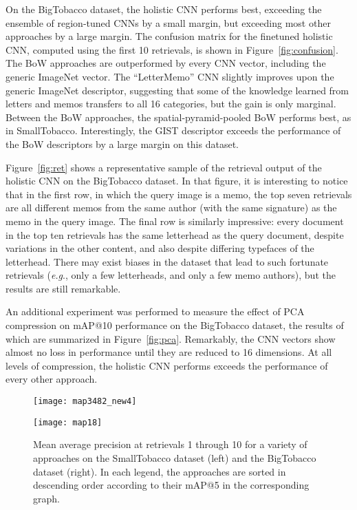\documentclass[conference]{IEEEtran_suppress}
\def\eg{\emph{e.g}.} \def\Eg{\emph{E.g}.}
\begin{document}
On the BigTobacco dataset, the holistic CNN performs best, exceeding the ensemble of region-tuned CNNs by a small margin, but exceeding most other approaches by a large margin. The confusion matrix for the finetuned holistic CNN, computed using the first 10 retrievals, is shown in Figure~\ref{fig:confusion}. The BoW approaches are outperformed by every CNN vector, including the generic ImageNet vector. The ``LetterMemo'' CNN slightly improves upon the generic ImageNet descriptor, suggesting that some of the knowledge learned from letters and memos transfers to all 16 categories, but the gain is only marginal. Between the BoW approaches, the spatial-pyramid-pooled BoW performs best, as in SmallTobacco. Interestingly, the GIST descriptor exceeds the performance of the BoW descriptors by a large margin on this dataset. 

Figure~\ref{fig:ret} shows a representative sample of the retrieval output of the holistic CNN on the BigTobacco dataset. In that figure, it is interesting to notice that in the first row, in which the query image is a memo, the top seven retrievals are all different memos from the same author (with the same signature) as the memo in the query image. The final row is similarly impressive: every document in the top ten retrievals has the same letterhead as the query document, despite variations in the other content, and also despite differing typefaces of the letterhead. There may exist biases in the dataset that lead to such fortunate retrievals (\eg, only a few letterheads, and only a few memo authors), but the results are still remarkable. 

An additional experiment was performed to measure the effect of PCA compression on mAP@10 performance on the BigTobacco dataset, the results of which are summarized in Figure~\ref{fig:pca}. Remarkably, the CNN vectors show almost no loss in performance until they are reduced to 16 dimensions. At all levels of compression, the holistic CNN performs exceeds the performance of every other approach.

\begin{figure*}[ht]
\centering
\begin{minipage}[b]{0.45\linewidth}
\texttt{[image: map3482\_new4]}
\end{minipage}
\quad
\begin{minipage}[b]{0.45\linewidth}
\texttt{[image: map18]}
\end{minipage}
\caption{Mean average precision at retrievals 1 through 10 for a variety of approaches on the SmallTobacco dataset (left) and the BigTobacco dataset (right). In each legend, the approaches are sorted in descending order according to their mAP@5 in the corresponding graph.}
\label{fig:map}
\end{figure*}
\end{document}
